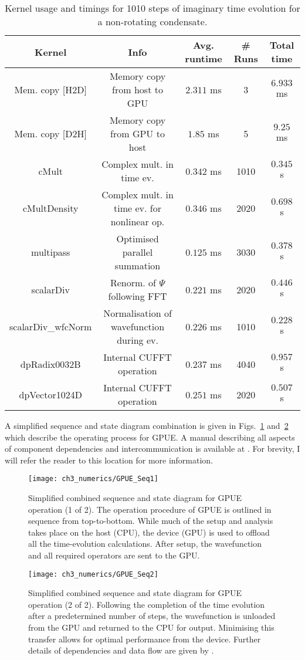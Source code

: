 \begin{table}
    \scriptsize
    \centering
\begin{tabular}{c|c|c|c|c}
\textbf{Kernel}  & \textbf{Info} & \textbf{Avg. runtime} & \textbf{\# Runs} & \textbf{Total time} \\
\hline
Mem. copy [H2D] & Memory copy from host to GPU & $2.311$ ms & 3 & $6.933$ ms\\
Mem. copy [D2H] & Memory copy from GPU to host & $1.85$ ms & 5 & $9.25$ ms\\
cMult & Complex mult. in time ev. & $0.342$ ms & 1010 & $0.345$ s\\
cMultDensity & Complex mult. in time ev. for nonlinear op. & $0.346$ ms & 2020 & $0.698$ s \\
multipass & Optimised parallel summation & $0.125$ ms & 3030 & $0.378$ s \\
scalarDiv & Renorm. of $\Psi$ following FFT & $0.221$ ms & 2020 & $0.446$ s \\
scalarDiv_wfcNorm & Normalisation of wavefunction during ev. & $0.226$ ms & 1010 & $0.228$ s\\
dpRadix0032B & Internal CUFFT operation & $0.237$ ms & 4040 & $0.957$ s \\
dpVector1024D & Internal CUFFT operation & $0.251$ ms & 2020 & $0.507$ s \\
\end{tabular}
\caption{Kernel usage and timings for 1010 steps of imaginary time evolution for a non-rotating condensate.}\label{tbl:gpue_im}
\end{table}

A simplified sequence and state diagram combination is given in Figs.~\ref{fig:gpue_seq1} and~\ref{fig:gpue_seq2} which describe the operating process for GPUE. A manual describing all aspects of component dependencies and intercommunication is available at \cite[docs/gpue.pdf]{MLXD_GPUE}. For brevity, I will refer the reader to this location for more information.

\begin{figure}[]
    \centering
        \texttt{[image: ch3\_numerics/GPUE\_Seq1]}
    \caption{Simplified combined sequence and state diagram for GPUE operation (1 of 2). The operation procedure of GPUE is outlined in sequence from top-to-bottom. While much of the setup and analysis takes place on the host (CPU), the device (GPU) is used to offload all the time-evolution calculations. After setup, the wavefunction and all required operators are sent to the GPU.}
    \label{fig:gpue_seq1}
\end{figure}
\begin{figure}[]
    \centering
        \texttt{[image: ch3\_numerics/GPUE\_Seq2]}
    \caption{Simplified combined sequence and state diagram for GPUE operation (2 of 2). Following the completion of the time evolution after a predetermined number of steps, the wavefunction is unloaded from the GPU and returned to the CPU for output. Minimising this transfer allows for optimal performance from the device. Further details of dependencies and data flow are given by \cite[docs/gpue.pdf]{MLXD_GPUE}.}
    \label{fig:gpue_seq2}
\end{figure}

